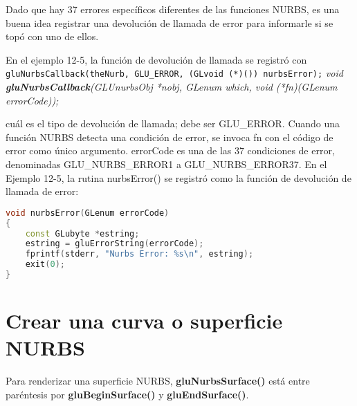 Dado que hay 37 errores específicos diferentes de las funciones NURBS,
es una buena idea registrar una devolución de llamada de error para
informarle si se topó con uno de ellos.

En el ejemplo 12-5, la función de devolución de llamada se registró con
\linebreak
\texttt{gluNurbsCallback(theNurb, GLU\_ERROR, (GLvoid (*)()) nurbsError);}
\linebreak
\emph{void \textbf{gluNurbsCallback}(GLUnurbsObj *nobj, GLenum which,
void (*fn)(GLenum errorCode));}

cuál es el tipo de devolución de llamada; debe ser GLU\_ERROR. Cuando una función NURBS detecta una condición de error, se invoca fn con el código de error como único argumento. errorCode es una de las 37 condiciones de error, denominadas GLU\_NURBS\_ERROR1 a GLU\_NURBS\_ERROR37.
\linebreak
En el Ejemplo 12-5, la rutina nurbsError() se registró como la función de devolución de llamada de error:

\begin{lstlisting}[language=C++]
void nurbsError(GLenum errorCode)
{
    const GLubyte *estring;
    estring = gluErrorString(errorCode);
    fprintf(stderr, "Nurbs Error: %s\n", estring);
    exit(0);
}
\end{lstlisting}

\section{Crear una curva o superficie NURBS}

Para renderizar una superficie NURBS, \textbf{gluNurbsSurface()}
está entre paréntesis por \textbf{gluBeginSurface()} y
\textbf{gluEndSurface()}.

